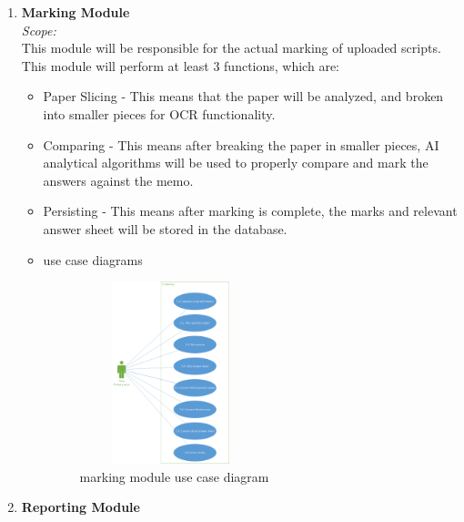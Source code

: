 \documentclass{article}
\begin{document}
\begin{enumerate}
			\item \textbf{Marking Module}\\
				\textit{Scope:}\\
				This module will be responsible for the actual marking of uploaded scripts. This module will perform at least 3 functions, which are:
				\begin{itemize}
					\item Paper Slicing - This means that the paper will be analyzed, and broken into smaller pieces for OCR functionality.
					\item Comparing - This means after breaking the paper in smaller pieces, AI analytical algorithms will be used to properly compare and mark the answers against the memo.
					\item Persisting - This means after marking is complete, the marks and relevant answer sheet will be stored in the database.
				\end{itemize}
\begin{itemize}
								\item use case diagrams\\
								\begin{figure}[h]
								\includegraphics[width=200px, height=200px]{marking.png}
								\caption{marking module use case diagram}
								\end{figure}
					\end{itemize}
			\item \textbf{Reporting Module}\\
			

\end{enumerate}
\end{document}
